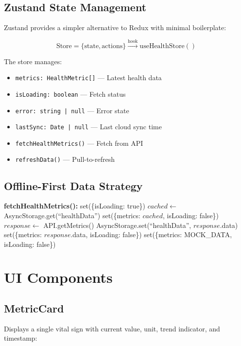 \documentclass[conference]{IEEEtran}
\begin{document}
\subsection{Zustand State Management}
Zustand provides a simpler alternative to Redux with minimal boilerplate:

\begin{equation}
\text{Store} = \{\text{state}, \text{actions}\} \xrightarrow{\text{hook}} \text{useHealthStore}()
\end{equation}

The store manages:
\begin{itemize}
    \item \texttt{metrics: HealthMetric[]} --- Latest health data
    \item \texttt{isLoading: boolean} --- Fetch status
    \item \texttt{error: string | null} --- Error state
    \item \texttt{lastSync: Date | null} --- Last cloud sync time
    \item \texttt{fetchHealthMetrics()} --- Fetch from API
    \item \texttt{refreshData()} --- Pull-to-refresh
\end{itemize}

\subsection{Offline-First Data Strategy}

\begin{algorithmic}
\STATE \textbf{fetchHealthMetrics():}
\STATE set(\{isLoading: true\})
\STATE $cached \leftarrow$ AsyncStorage.get(``healthData'')
    \STATE set(\{metrics: $cached$, isLoading: false\})
\ENDIF
\STATE $response \leftarrow$ API.getMetrics()
    \STATE AsyncStorage.set(``healthData'', $response$.data)
    \STATE set(\{metrics: $response$.data, isLoading: false\})
    \STATE set(\{metrics: MOCK\_DATA, isLoading: false\})
\ENDIF
\end{algorithmic}

\section{UI Components}

\subsection{MetricCard}
Displays a single vital sign with current value, unit, trend indicator, and timestamp:
\end{document}

